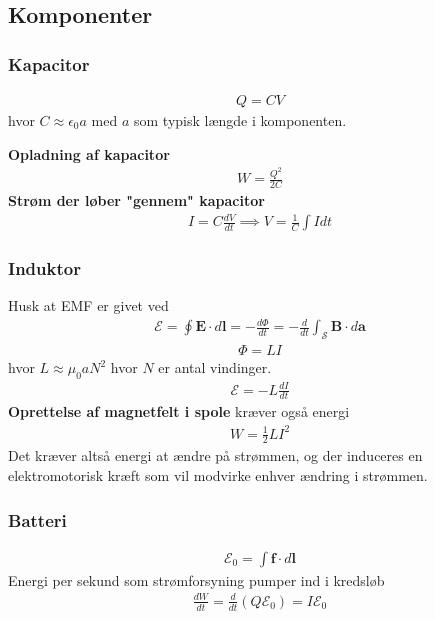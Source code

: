 \documentclass[a4paper]{article}
\begin{document}
    \subsection{Komponenter}
    \subsubsection{Kapacitor} 
    \begin{align*}
        Q = CV \tag{K(8)}
    \end{align*}
    hvor \(C \approx \epsilon_0 a\) med \(a\) som typisk længde i komponenten.  
    
    \textbf{Opladning af kapacitor}
    \begin{align*}
        W = \frac{Q^2}{2C} \tag{K(9)}
    \end{align*}
    \textbf{Strøm der løber "gennem" kapacitor}\begin{align*}
        I = C \frac{dV}{dt} \implies V = \frac{1}{C} \int I dt \tag{K(10)}
    \end{align*}
    \subsubsection{Induktor}

    Husk at EMF er givet ved \begin{align*}
        \mathcal{E} = \oint \mathbf{E} \cdot d \mathbf{l} = - \frac{d \Phi }{dt} = - \frac{d}{dt} \int_{\mathcal{S} } \mathbf{B} \cdot d \mathbf{a}  \tag{K(11)}
    \end{align*} 
    \begin{align*}
        \Phi = LI
    \end{align*}
    hvor \(L \approx \mu _0 a N^{2} \) hvor \(N\) er antal vindinger.  
    \begin{align*}
        \mathcal{E} = - L \frac{dI}{dt} \tag{K(12)}
    \end{align*}
    \textbf{Oprettelse af magnetfelt i spole} kræver også energi \begin{align*}
        W = \frac{1}{2} L I^{2} \tag{K(13)}
    \end{align*}
    Det kræver altså energi at ændre på strømmen, og der induceres en elektromotorisk kræft som vil modvirke enhver ændring i strømmen.
    \subsubsection{Batteri}
    \begin{align*}
        \mathcal{E} _0 = \int \mathbf{f} \cdot  d \mathbf{l} \tag{K(14)}
    \end{align*} 
    Energi per sekund som strømforsyning pumper ind i kredsløb
    \begin{align*}
        \frac{dW}{dt} = \frac{d}{dt}\left( Q \mathcal{E} _0 \right) = I \mathcal{E} _0 \tag{K(15)}
    \end{align*}
\end{document}
